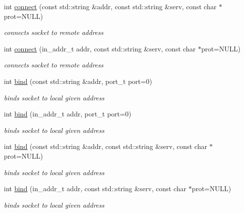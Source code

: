 \begin{CompactItemize}
int \hyperlink{classsocketpp_1_1BaseSocket_eb0f4c84546c22fd9023169701d8fae8}{connect} (const std::string \&addr, const std::string \&serv, const char $\ast$prot=NULL)
\begin{CompactList}\small\item\em connects socket to remote address \item\end{CompactList}\item 
int \hyperlink{classsocketpp_1_1BaseSocket_83666b030a93368675a842a992e0c2af}{connect} (in\_\-addr\_\-t addr, const std::string \&serv, const char $\ast$prot=NULL)
\begin{CompactList}\small\item\em connects socket to remote address \item\end{CompactList}\item 
int \hyperlink{classsocketpp_1_1BaseSocket_78c2a8e6a5c7dfbc708c9cd637e88e51}{bind} (const std::string \&addr, port\_\-t port=0)
\begin{CompactList}\small\item\em binds socket to local given address \item\end{CompactList}\item 
int \hyperlink{classsocketpp_1_1BaseSocket_d3df73f534900d40f9dff26171ec93b5}{bind} (in\_\-addr\_\-t addr, port\_\-t port=0)
\begin{CompactList}\small\item\em binds socket to local given address \item\end{CompactList}\item 
int \hyperlink{classsocketpp_1_1BaseSocket_4775f13f8e1cceaaed40106162b2149f}{bind} (const std::string \&addr, const std::string \&serv, const char $\ast$prot=NULL)
\begin{CompactList}\small\item\em binds socket to local given address \item\end{CompactList}\item 
int \hyperlink{classsocketpp_1_1BaseSocket_aab800bcb5ee48cd4410ae2b9ed83e23}{bind} (in\_\-addr\_\-t addr, const std::string \&serv, const char $\ast$prot=NULL)
\begin{CompactList}\small\item\em binds socket to local given address \item\end{CompactList}\item 

\end{CompactItemize}
